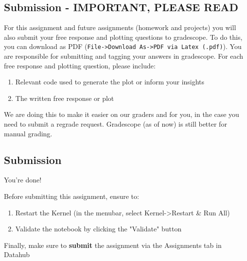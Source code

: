 \documentclass[11pt]{article}
\providecommand{\tightlist}{%
      \setlength{\itemsep}{0pt}\setlength{\parskip}{0pt}}
\begin{document}
    \subsection{Submission - IMPORTANT, PLEASE
READ}\label{submission---important-please-read}

For this assignment and future assignments (homework and projects) you
will also submit your free response and plotting questions to
gradescope. To do this, you can download as PDF
(\texttt{File-\textgreater{}Download\ As-\textgreater{}PDF\ via\ Latex\ (.pdf)}).
You are responsible for submitting and tagging your answers in
gradescope. For each free response and plotting question, please
include:

\begin{enumerate}
\def\labelenumi{\arabic{enumi}.}
\tightlist
\item
  Relevant code used to generate the plot or inform your insights
\item
  The written free response or plot
\end{enumerate}

We are doing this to make it easier on our graders and for you, in the
case you need to submit a regrade request. Gradescope (as of now) is
still better for manual grading.

    \subsection{Submission}\label{submission}

You're done!

Before submitting this assignment, ensure to:

\begin{enumerate}
\def\labelenumi{\arabic{enumi}.}
\tightlist
\item
  Restart the Kernel (in the menubar, select
  Kernel-\textgreater{}Restart \& Run All)
\item
  Validate the notebook by clicking the "Validate" button
\end{enumerate}

Finally, make sure to \textbf{submit} the assignment via the Assignments
tab in Datahub


    
    
    
    
\end{document}
